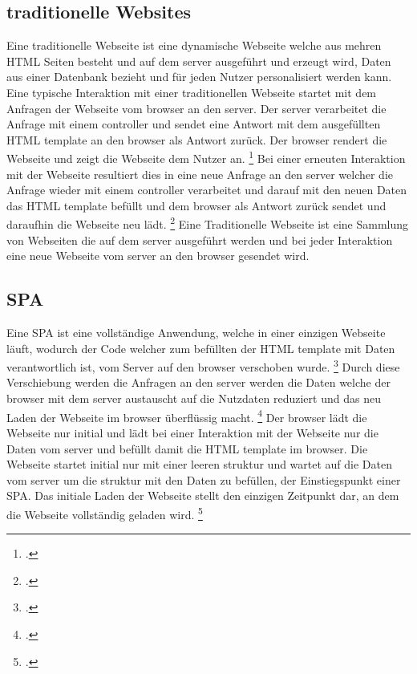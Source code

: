 \subsection{traditionelle Websites}
Eine traditionelle Webseite ist eine dynamische Webseite welche aus mehren \ac{HTML} Seiten besteht und auf dem \gls{server} ausgeführt und erzeugt wird,
Daten aus einer Datenbank bezieht und für jeden Nutzer personalisiert werden kann.
Eine typische Interaktion mit einer traditionellen Webseite startet mit dem Anfragen der Webseite vom \gls{browser} an den \gls{server}.
Der \gls{server} verarbeitet die Anfrage mit einem \gls{controller} und sendet eine Antwort mit dem ausgefüllten \ac{HTML} \gls{template} an den \gls{browser} als Antwort zurück.
Der \gls{browser} rendert die Webseite und zeigt die Webseite dem Nutzer an. \footcite[Vgl. ][Seite 32]{Robbins2018}
Bei einer erneuten Interaktion mit der Webseite resultiert dies in eine neue Anfrage an den \gls{server} welcher die Anfrage wieder mit einem \gls{controller} verarbeitet und darauf mit
den neuen Daten das \ac{HTML} \gls{template} befüllt und dem \gls{browser} als Antwort zurück sendet und daraufhin die Webseite neu lädt. \footcite[Vgl. ][Seite 5]{Scott2015}
\newline
Eine Traditionelle Webseite ist eine Sammlung von Webseiten die auf dem \gls{server} ausgeführt werden und bei jeder Interaktion eine neue Webseite vom \gls{server} an den \gls{browser} gesendet wird.

\subsection{\ac{SPA}}
Eine \ac{SPA} ist eine vollständige Anwendung, welche in einer einzigen Webseite läuft, wodurch der Code welcher zum befüllten der \ac{HTML} \gls{template}
mit Daten verantwortlich ist, vom Server auf den \gls{browser} verschoben wurde. \footcite[Vgl.][Seite 4]{Scott2015}
Durch diese Verschiebung werden die Anfragen an den \gls{server} werden die Daten welche der \gls{browser} mit dem \gls{server} austauscht auf die Nutzdaten reduziert
und das neu Laden der Webseite im \gls{browser} überflüssig macht. \footcite[Vgl.][Seite 7]{Scott2015}
Der \gls{browser} lädt die Webseite nur initial und lädt bei einer Interaktion mit der Webseite nur die Daten vom \gls{server} und befüllt damit die \ac{HTML} \gls{template} im \gls{browser}.
Die Webseite startet initial nur mit einer leeren \gls{struktur} und wartet auf die Daten vom \gls{server} um die \gls{struktur} mit den Daten zu befüllen, der Einstiegspunkt einer \ac{SPA}.
Das initiale Laden der Webseite stellt den einzigen Zeitpunkt dar, an dem die Webseite vollständig geladen wird. \footcite[Vgl.][Seite 8]{Scott2015}